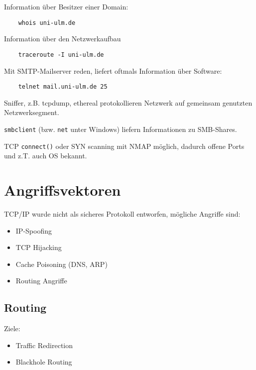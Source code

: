 \vspace{.3cm}

Information über Besitzer einer Domain:
\begin{lstlisting}
    whois uni-ulm.de
\end{lstlisting}

\vspace{.3cm}

Information über den Netzwerkaufbau
\begin{lstlisting}
    traceroute -I uni-ulm.de
\end{lstlisting}

\vspace{.3cm}

Mit SMTP-Mailserver reden, liefert oftmals Information über Software:
\begin{lstlisting}
    telnet mail.uni-ulm.de 25
\end{lstlisting}

Sniffer, z.B. tcpdump, ethereal protokollieren Netzwerk auf gemeinsam genutzten Netzwerksegment.

\vspace{.3cm}

\lstinline{smbclient} (bzw. \lstinline{net} unter Windows) liefern Informationen zu SMB-Shares.

\vspace{.3cm}

TCP \lstinline{connect()} oder SYN scanning mit NMAP möglich, dadurch offene Ports und z.T. auch OS bekannt.

\section{Angriffsvektoren}
TCP/IP wurde nicht als sicheres Protokoll entworfen, mögliche Angriffe sind:
\begin{itemize}
    \item IP-Spoofing
    \item TCP Hijacking
    \item Cache Poisoning (DNS, ARP)
    \item Routing Angriffe
\end{itemize}

\subsection{Routing}
Ziele:
\begin{itemize}
    \item Traffic Redirection
    \item Blackhole Routing
\end{itemize}


